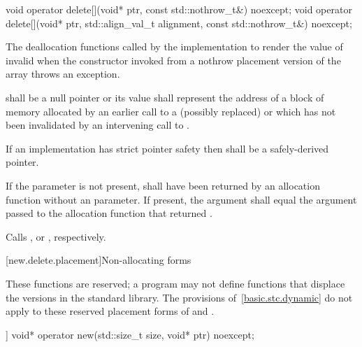 %
\begin{itemdecl}
void operator delete[](void* ptr, const std::nothrow_t&) noexcept;
void operator delete[](void* ptr, std::align_val_t alignment, const std::nothrow_t&) noexcept;
\end{itemdecl}

\begin{itemdescr}
\pnum
\effects
The
deallocation functions
called by the implementation
to render the value of  invalid
when the constructor invoked from a nothrow
placement version of the array  throws an exception.

\pnum
\replaceable
{}

\pnum
\requires
{} shall be a null pointer or
its value shall represent the address of
a block of memory allocated by
an earlier call to a (possibly replaced)
or
which has not been invalidated by an intervening call to
.

\pnum
\requires
If an implementation has strict pointer safety
then  shall be a safely-derived pointer.

\pnum
\requires
If the  parameter is not present,
 shall have been returned by an allocation function
without an  parameter.
If present, the  argument
shall equal the  argument
passed to the allocation function that returned .

\pnum
{}
Calls ,
or ,
respectively.
\end{itemdescr}

[new.delete.placement]{Non-allocating forms}

\pnum
These functions are reserved; a \Cpp{} program may not define functions that displace
the versions in the \Cpp{} standard library.
The provisions of~\ref{basic.stc.dynamic} do not apply to these reserved
placement forms of  and .

%
\begin{itemdecl}
[[nodiscard]] void* operator new(std::size_t size, void* ptr) noexcept;
\end{itemdecl}

